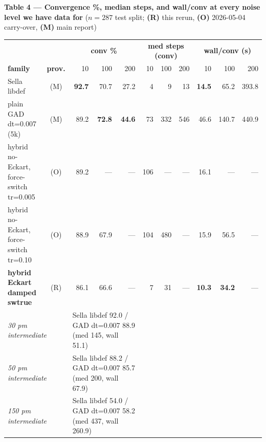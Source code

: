 \documentclass[11pt]{article}
\begin{document}
\begin{center}\footnotesize
\textbf{Table 4 --- Convergence \%, median steps, and wall/conv at every noise level we have data for}
($n=287$ test split; \textbf{(R)} this rerun, \textbf{(O)} 2026-05-04 carry-over,
\textbf{(M)} main report)\\[0.4em]
\begin{tabular}{l c | r r r | r r r | r r r}
\toprule
& & \multicolumn{3}{c|}{\textbf{conv \%}} & \multicolumn{3}{c|}{\textbf{med steps (conv)}} & \multicolumn{3}{c}{\textbf{wall/conv (s)}} \\
\textbf{family} & \textbf{prov.} & 10 & 100 & 200 & 10 & 100 & 200 & 10 & 100 & 200 \\
\midrule
Sella libdef                              & (M) & \textbf{92.7} & 70.7 & 27.2 & 4   & 9    & 13   & \textbf{14.5} & 65.2  & 393.8 \\
plain GAD dt=0.007 (5k)                   & (M) & 89.2          & \textbf{72.8} & \textbf{44.6} & 73  & 332  & 546  & 46.6          & 140.7 & 440.9 \\
hybrid no-Eckart, force-switch tr=0.005   & (O) & 89.2          & ---           & ---  & 106 & ---  & ---  & 16.1          & ---   & ---   \\
hybrid no-Eckart, force-switch tr=0.10    & (O) & 88.9          & 67.9          & ---  & 104 & 480  & ---  & 15.9          & 56.5  & ---   \\
\textbf{hybrid Eckart damped swtrue}      & (R) & 86.1          & 66.6          & ---  & 7   & 31   & ---  & \textbf{10.3} & \textbf{34.2}  & ---   \\
\midrule
\multicolumn{2}{l|}{\emph{30 pm intermediate}} & \multicolumn{3}{l|}{Sella libdef 92.0 / GAD dt=0.007 88.9 (med 145, wall 51.1)} & \multicolumn{6}{l}{} \\
\multicolumn{2}{l|}{\emph{50 pm intermediate}} & \multicolumn{3}{l|}{Sella libdef 88.2 / GAD dt=0.007 85.7 (med 200, wall 67.9)} & \multicolumn{6}{l}{} \\
\multicolumn{2}{l|}{\emph{150 pm intermediate}}& \multicolumn{3}{l|}{Sella libdef 54.0 / GAD dt=0.007 58.2 (med 437, wall 260.9)} & \multicolumn{6}{l}{} \\
\bottomrule
\end{tabular}
\end{center}
\end{document}
